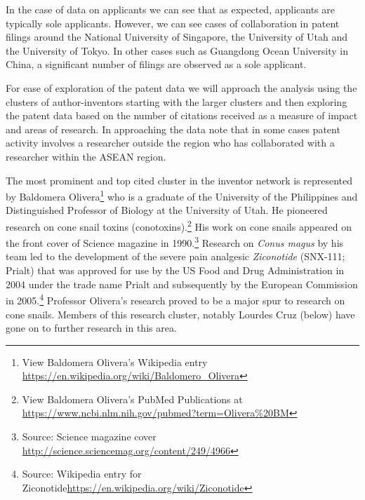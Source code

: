 \documentclass[openany]{book}
\let\rmarkdownfootnote\footnote%
\def\footnote{\protect\rmarkdownfootnote}
\theoremstyle{definition}
\theoremstyle{definition}
\theoremstyle{definition}
\theoremstyle{remark}
\begin{document}
In the case of data on applicants we can see that as expected,
applicants are typically sole applicants. However, we can see cases of
collaboration in patent filings around the National University of
Singapore, the University of Utah and the University of Tokyo. In other
cases such as Guangdong Ocean University in China, a significant number
of filings are observed as a sole applicant.

For ease of exploration of the patent data we will approach the analysis
using the clusters of author-inventors starting with the larger clusters
and then exploring the patent data based on the number of citations
received as a measure of impact and areas of research. In approaching
the data note that in some cases patent activity involves a researcher
outside the region who has collaborated with a researcher within the
ASEAN region.

The most prominent and top cited cluster in the inventor network is
represented by Baldomera Olivera\footnote{View Baldomera Olivera's
  Wikipedia entry \url{https://en.wikipedia.org/wiki/Baldomero_Olivera}}
who is a graduate of the University of the Philippines and Distinguished
Professor of Biology at the University of Utah. He pioneered research on
cone snail toxins (conotoxins).\footnote{View Baldomera Olivera's PubMed
  Publications at
  \url{https://www.ncbi.nlm.nih.gov/pubmed?term=Olivera\%20BM}} His work
on cone snails appeared on the front cover of Science magazine in
1990.\footnote{Source: Science magazine cover
  \url{http://science.sciencemag.org/content/249/4966}} Research on
\emph{Conus magus} by his team led to the development of the severe pain
analgesic \emph{Ziconotide} (SNX-111; Prialt) that was approved for use
by the US Food and Drug Administration in 2004 under the trade name
Prialt and subsequently by the European Commission in 2005.\footnote{Source:
  Wikipedia entry for
  Ziconotide\url{https://en.wikipedia.org/wiki/Ziconotide}} Professor
Olivera's research proved to be a major spur to research on cone snails.
Members of this research cluster, notably Lourdes Cruz (below) have gone
on to further research in this area.
\end{document}
